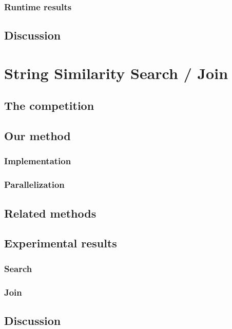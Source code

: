 \subsection{Runtime results}
\section{Discussion}

\chapter{String Similarity Search / Join}
\section{The competition}
\section{Our method}
\subsection{Implementation}
\subsection{Parallelization}
\section{Related methods}
\section{Experimental results}
\subsection{Search}
\subsection{Join}
\section{Discussion}
